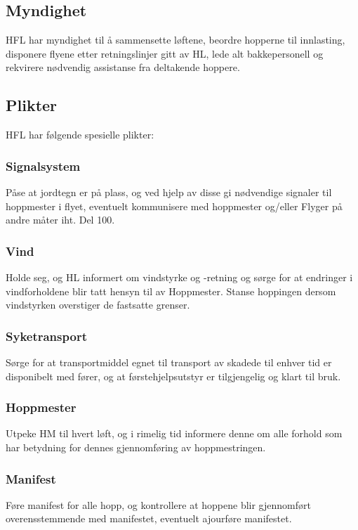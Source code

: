 \subsection{Myndighet}
HFL har myndighet til å sammensette løftene, beordre hopperne til innlasting, disponere flyene etter retningslinjer gitt av HL, lede alt bakkepersonell og rekvirere nødvendig assistanse fra deltakende hoppere.

\subsection{Plikter}
HFL har følgende spesielle plikter:

\subsubsection{Signalsystem}
Påse at jordtegn er på plass, og ved hjelp av disse gi nødvendige signaler til hoppmester i flyet, eventuelt kommunisere med hoppmester og/eller Flyger på andre måter iht. Del 100.

\subsubsection{Vind}
Holde seg, og HL informert om vindstyrke og -retning og sørge for at endringer i vindforholdene blir tatt hensyn til av Hoppmester. Stanse hoppingen dersom vindstyrken overstiger de fastsatte grenser.

\subsubsection{Syketransport}
Sørge for at transportmiddel egnet til transport av skadede til enhver tid er disponibelt med fører, og at førstehjelpsutstyr er tilgjengelig og klart til bruk.

\subsubsection{Hoppmester}
Utpeke HM til hvert løft, og i rimelig tid informere denne om alle forhold som har betydning for dennes gjennomføring av hoppmestringen.

\subsubsection{Manifest}
Føre manifest for alle hopp, og kontrollere at hoppene blir gjennomført overensstemmende med manifestet, eventuelt ajourføre manifestet.

